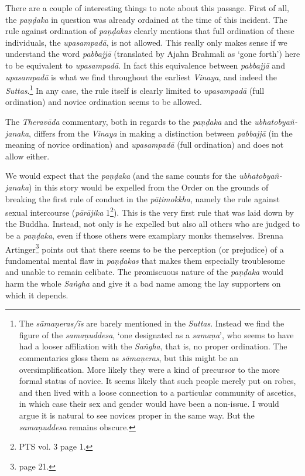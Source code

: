 There are a couple of interesting things to note about this passage. First of all, the \textit{paṇḍaka} in question was already ordained at the time of this incident. The rule against ordination of \textit{paṇḍakas} clearly mentions that full ordination of these individuals, the \textit{upasampadā}, is not allowed. This really only makes sense if we understand the word \textit{pabbajjā} (translated by Ajahn Brahmali as `gone forth') here to be equivalent to \textit{upasampadā}. In fact this equivalence between \textit{pabbajjā} and \textit{upasampadā} is what we find throughout the earliest \textit{Vinaya}, and indeed the \textit{Suttas}.\footnote{The \textit{sāmaṇeras/īs} are barely mentioned in the \textit{Suttas}. Instead we find the figure of the \textit{samaṇuddesa}, `one designated as a \textit{samaṇa}', who seems to have had a looser affiliation with the \textit{Saṅgha}, that is, no proper ordination. The commentaries gloss them as \textit{sāmaṇeras}, but this might be an oversimplification. More likely they were a kind of precursor to the more formal status of novice. It seems likely that such people merely put on robes, and then lived with a loose connection to a particular community of ascetics, in which case their sex and gender would have been a non-issue. I would argue it is natural to see novices proper in the same way. But the \textit{samaṇuddesa} remains obscure.} In any case, the rule itself is clearly limited to \textit{upasampadā} (full ordination) and novice ordination seems to be allowed.

The \textit{Theravāda} commentary, both in regards to the \textit{paṇḍaka} and the \textit{ubhatob­yañ­janaka}, differs from the \textit{Vinaya} in making a distinction between \textit{pabbajjā} (in the meaning of novice ordination) and \textit{upasampadā} (full ordination) and does not allow either.

We would expect that the \textit{paṇḍaka} (and the same counts for the \textit{ubhatob­yañ­janaka}) in this story would be expelled from the Order on the grounds of breaking the first rule of conduct in the \textit{pāṭimokkha}, namely the rule against sexual intercourse (\textit{pārājika} 1\footnote{PTS vol. 3 page 1.}). This is the very first rule that was laid down by the Buddha. Instead, not only is he expelled but also all others who are judged to be a \textit{paṇḍaka}, even if those others were examplary monks themselves. Brenna Artinger\footnote{\cite{artinger} page 21.} points out that there seems to be the perception (or prejudice) of a fundamental mental flaw in \textit{paṇḍakas} that makes them especially troublesome and unable to remain celibate. The promiscuous nature of the \textit{paṇḍaka} would harm the whole \textit{Saṅgha} and give it a bad name among the lay supporters on which it depends.

